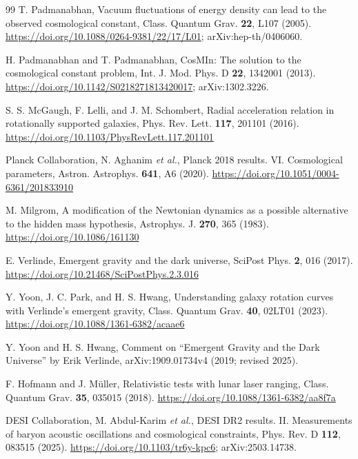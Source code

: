 \documentclass[aps,prd,twocolumn,superscriptaddress,nofootinbib,showkeys]{revtex4-2}
\begin{document}
\begin{thebibliography}{99}
 T. Padmanabhan, Vacuum fluctuations of energy density can lead to the observed cosmological constant, Class. Quantum Grav. \textbf{22}, L107 (2005). \url{https://doi.org/10.1088/0264-9381/22/17/L01}; arXiv:hep-th/0406060.

 H. Padmanabhan and T. Padmanabhan, CosMIn: The solution to the cosmological constant problem, Int. J. Mod. Phys. D \textbf{22}, 1342001 (2013). \url{https://doi.org/10.1142/S0218271813420017}; arXiv:1302.3226.

 S. S. McGaugh, F. Lelli, and J. M. Schombert, Radial acceleration relation in rotationally supported galaxies, Phys. Rev. Lett. \textbf{117}, 201101 (2016). \url{https://doi.org/10.1103/PhysRevLett.117.201101}

 Planck Collaboration, N. Aghanim \emph{et al.}, Planck 2018 results. VI. Cosmological parameters, Astron. Astrophys. \textbf{641}, A6 (2020). \url{https://doi.org/10.1051/0004-6361/201833910}

 M. Milgrom, A modification of the Newtonian dynamics as a possible alternative to the hidden mass hypothesis, Astrophys. J. \textbf{270}, 365 (1983). \url{https://doi.org/10.1086/161130}

 E. Verlinde, Emergent gravity and the dark universe, SciPost Phys. \textbf{2}, 016 (2017). \url{https://doi.org/10.21468/SciPostPhys.2.3.016}

 Y. Yoon, J. C. Park, and H. S. Hwang, Understanding galaxy rotation curves with Verlinde's emergent gravity, Class. Quantum Grav. \textbf{40}, 02LT01 (2023). \url{https://doi.org/10.1088/1361-6382/acaae6}

 Y. Yoon and H. S. Hwang, Comment on ``Emergent Gravity and the Dark Universe'' by Erik Verlinde, arXiv:1909.01734v4 (2019; revised 2025).

 F. Hofmann and J. M\"uller, Relativistic tests with lunar laser ranging, Class. Quantum Grav. \textbf{35}, 035015 (2018). \url{https://doi.org/10.1088/1361-6382/aa8f7a}

 DESI Collaboration, M. Abdul-Karim \emph{et al.}, DESI DR2 results. II. Measurements of baryon acoustic oscillations and cosmological constraints, Phys. Rev. D \textbf{112}, 083515 (2025). \url{https://doi.org/10.1103/tr6y-kpc6}; arXiv:2503.14738.

\end{thebibliography}
\end{document}
